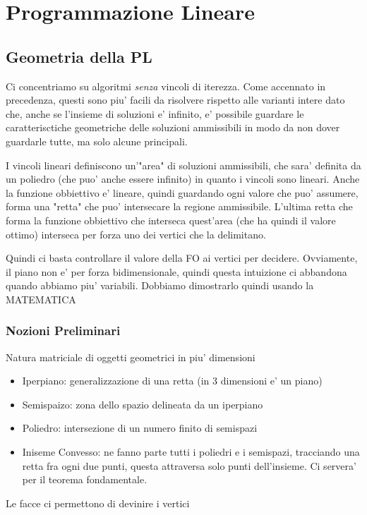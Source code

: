 
\chapter{Programmazione Lineare}
\section{Geometria della PL}
Ci concentriamo su algoritmi \textit{senza} vincoli di iterezza. Come accennato in precedenza, questi sono piu' facili da risolvere rispetto alle varianti intere dato che, anche se l'insieme di soluzioni e' infinito, e' possibile guardare le caratterisctiche geometriche delle soluzioni ammissibili in modo da non dover guardarle tutte, ma solo alcune principali.

I vincoli lineari definiscono un'"area" di soluzioni ammissibili, che sara' definita da un poliedro (che puo' anche essere infinito) in quanto i vincoli sono lineari. Anche la funzione obbiettivo e' lineare, quindi guardando ogni valore che puo' assumere, forma una "retta" che puo' intersecare la regione ammissibile. L'ultima retta che forma la funzione obbiettivo che interseca quest'area (che ha quindi il valore ottimo) interseca per forza uno dei vertici che la delimitano.

Quindi ci basta controllare il valore della FO ai vertici per decidere. Ovviamente, il piano non e' per forza bidimensionale, quindi questa intuizione ci abbandona quando abbiamo piu' variabili. Dobbiamo dimostrarlo quindi usando la MATEMATICA

\subsection{Nozioni Preliminari}
Natura matriciale di oggetti geometrici in piu' dimensioni
\begin{itemize}
  \item Iperpiano: generalizzazione di una retta (in 3 dimensioni e' un piano)
  \item Semispaizo: zona dello spazio delineata da un iperpiano
  \item Poliedro: intersezione di un numero finito di semispazi
  \item Iniseme Convesso: ne fanno parte tutti i poliedri e i semispazi, tracciando una retta fra ogni due punti, questa attraversa solo punti dell'insieme. Ci servera' per il teorema fondamentale.
\end{itemize}

Le facce ci permettono di devinire i vertici

